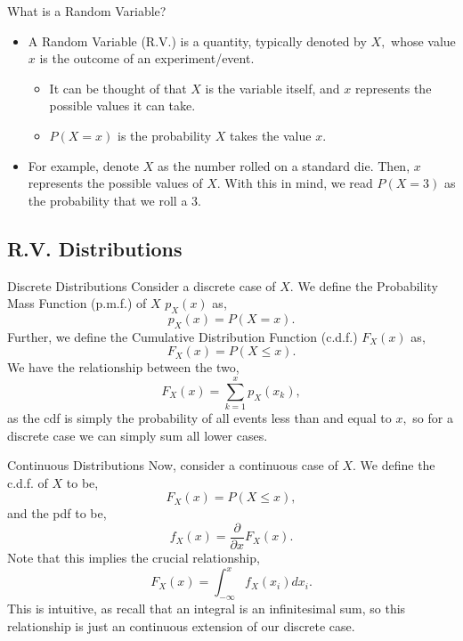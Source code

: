 \documentclass{beamer}
\begin{document}
\begin{frame}{What is a Random Variable?}
    \begin{itemize}
        \item A Random Variable (R.V.) is a quantity, typically denoted by $X,$ whose value $x$ is the outcome of an experiment/event.
        \begin{itemize}
            \item It can be thought of that $X$ is the variable itself, and $x$ represents the possible values it can take.
            \item$P(X=x)$ is the probability $X$ takes the value $x.$
        \end{itemize}
        \item For example, denote $X$ as the number rolled on a standard die. Then, $x$ represents the possible values of $X.$ With this in mind, we read $P(X=3)$ as the probability that we roll a 3.
    \end{itemize}
\end{frame}

\subsection{R.V. Distributions}

\begin{frame}{Discrete Distributions}
    Consider a discrete case of $X.$ We define the Probability Mass Function (p.m.f.) of $X$ $p_X(x)$ as,
    $$
    p_X(x) = P(X=x).
    $$
    Further, we define the Cumulative Distribution Function (c.d.f.) $F_X(x)$ as,
    $$
    F_X(x) = P(X \le x).
    $$
    We have the relationship between the two,
    $$
    F_X(x) = \sum_{k=1}^x p_X(x_k),
    $$
    as the cdf is simply the probability of all events less than and equal to $x,$ so for a discrete case we can simply sum all lower cases.
\end{frame}

\begin{frame}{Continuous Distributions}
    Now, consider a continuous case of $X.$ We define the c.d.f. of $X$ to be,
    $$
    F_X(x) = P(X \le x),
    $$
    and the pdf to be,
    $$
    f_X(x) = \frac{\partial}{\partial x} F_X(x).
    $$
    Note that this implies the crucial relationship,
    $$
    F_X(x) = \int_{-\infty }^{x} f_X(x_i) dx_i.
    $$
    This is intuitive, as recall that an integral is an infinitesimal sum, so this relationship is just an continuous extension of our discrete case.
\end{frame}
\end{document}
